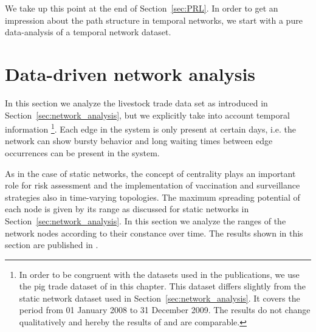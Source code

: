 We take up this point at the end of Section~\ref{sec:PRL}.
In order to get an impression about the path structure in temporal networks, we start with a pure data-analysis of a temporal network dataset. 

\section{Data-driven network analysis}\label{sec:Plos}
In this section we analyze the livestock trade data set as introduced in Section~\ref{sec:network_analysis}, but we explicitly take into account temporal information%
\footnote{%
In order to be congruent with the datasets used in the publications, we use the pig trade dataset of \citep{Konschake:2013js} in this chapter.
This dataset differs slightly from the static network dataset used in Section~\ref{sec:network_analysis}.
It covers the period from 01 January 2008 to 31 December 2009.
The results do not change qualitatively and hereby the results of \citep{Konschake:2013js} and \citep{Lentz:2013PRL} are comparable.}. %
%
Each edge in the system is only present at certain days, i.e. the network can show bursty behavior and long waiting times between edge occurrences can be present in the system.

As in the case of static networks, the concept of centrality plays an important role for risk assessment and the implementation of vaccination and surveillance strategies also in time-varying topologies.
The maximum spreading potential of each node is given by its range as discussed for static networks in Section~\ref{sec:network_analysis}.
In this section we analyze the ranges of the network nodes according to their constance over time.
The results shown in this section are published in \citep{Konschake:2013js}.

